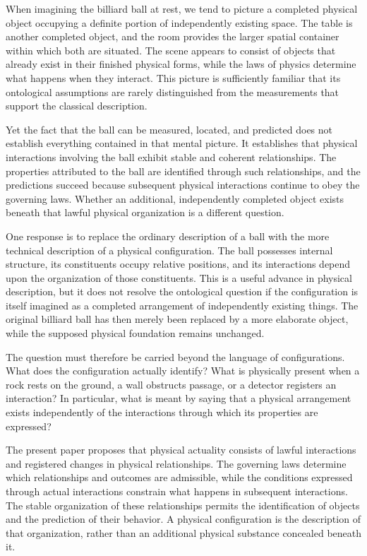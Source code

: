 \documentclass[12pt,onecolumn]{article}
\begin{document}
When imagining the billiard ball at rest, we tend to picture a completed physical object occupying a definite portion of independently existing space. The table is another completed object, and the room provides the larger spatial container within which both are situated. The scene appears to consist of objects that already exist in their finished physical forms, while the laws of physics determine what happens when they interact. This picture is sufficiently familiar that its ontological assumptions are rarely distinguished from the measurements that support the classical description.

Yet the fact that the ball can be measured, located, and predicted does not establish everything contained in that mental picture. It establishes that physical interactions involving the ball exhibit stable and coherent relationships. The properties attributed to the ball are identified through such relationships, and the predictions succeed because subsequent physical interactions continue to obey the governing laws. Whether an additional, independently completed object exists beneath that lawful physical organization is a different question.

One response is to replace the ordinary description of a ball with the more technical description of a physical configuration. The ball possesses internal structure, its constituents occupy relative positions, and its interactions depend upon the organization of those constituents. This is a useful advance in physical description, but it does not resolve the ontological question if the configuration is itself imagined as a completed arrangement of independently existing things. The original billiard ball has then merely been replaced by a more elaborate object, while the supposed physical foundation remains unchanged.

The question must therefore be carried beyond the language of configurations. What does the configuration actually identify? What is physically present when a rock rests on the ground, a wall obstructs passage, or a detector registers an interaction? In particular, what is meant by saying that a physical arrangement exists independently of the interactions through which its properties are expressed?

The present paper proposes that physical actuality consists of lawful interactions and registered changes in physical relationships. The governing laws determine which relationships and outcomes are admissible, while the conditions expressed through actual interactions constrain what happens in subsequent interactions. The stable organization of these relationships permits the identification of objects and the prediction of their behavior. A physical configuration is the description of that organization, rather than an additional physical substance concealed beneath it.
\end{document}
